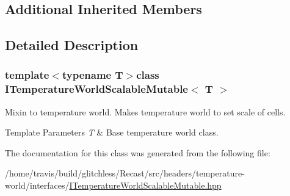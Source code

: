 \subsection*{Additional Inherited Members}


\subsection{Detailed Description}
\subsubsection*{template$<$typename T$>$class I\-Temperature\-World\-Scalable\-Mutable$<$ T $>$}

Mixin to temperature world. Makes temperature world to set scale of cells.


\begin{DoxyTemplParams}{Template Parameters}
{\em T} & Base temperature world class. \\
\hline
\end{DoxyTemplParams}


The documentation for this class was generated from the following file\-:\begin{DoxyCompactItemize}
\item 
/home/travis/build/glitchless/\-Recast/src/headers/temperature-\/world/interfaces/\hyperlink{_i_temperature_world_scalable_mutable_8hpp}{I\-Temperature\-World\-Scalable\-Mutable.\-hpp}\end{DoxyCompactItemize}
